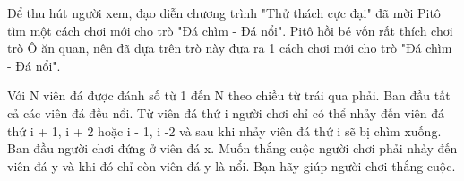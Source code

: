 Để thu hút người xem, đạo diễn chương trình "Thử thách cực đại" đã mời Pitô tìm một cách chơi mới cho trò "Đá chìm - Đá nổi". Pitô hồi bé vốn rất thích chơi trò Ô ăn quan, nên đã dựa trên trò này đưa ra 1 cách chơi mới cho trò "Đá chìm - Đá nổi".  

   Với N viên đá được đánh số từ 1 đến N theo chiều từ trái qua phải. Ban đầu tất cả các viên đá đều nổi. Từ viên đá thứ i người chơi chỉ có thể nhảy đến viên đá thứ i + 1, i + 2 hoặc i - 1, i -2 và sau khi nhảy viên đá thứ i sẽ bị chìm xuống. Ban đầu người chơi đứng ở viên đá x. Muốn thắng cuộc người chơi phải nhảy đến viên đá y và khi đó chỉ còn viên đá y là nổi. Bạn hãy giúp người chơi thắng cuộc.